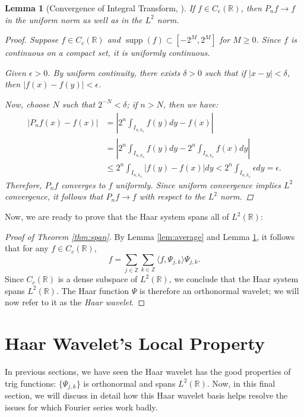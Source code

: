 \documentclass[11pt]{amsart}
\theoremstyle{theorem} %
\newtheorem{lem}[thm]{Lemma} %
\theoremstyle{definition}
\theoremstyle{example}
\theoremstyle{remark}
\numberwithin{equation}{section}
\newcommand{\R}{\mathbb{R}}
\newcommand{\Z}{\mathbb{Z}}
\DeclareMathOperator*{\supp}{supp}
\begin{document}
\begin{lem}[Convergence of Integral Transform, {\cite[517]{davidson}}] \label{lem:convergence}
	If $ f \in C_c(\R) $, then $ P_nf \to f $ in the uniform norm as well as in the $ L^2 $ norm.
	
	\begin{proof}
		Suppose $ f \in C_c(\R) $ and $ \supp(f) \subset [-2^M, 2^M] $ for $ M \geq 0 $. Since $ f $ is continuous on a compact set, it is uniformly continuous.
		
		Given $ \epsilon > 0 $. By uniform continuity, there exists $ \delta > 0 $ such that if $ |x-y| < \delta $, then $ |f(x) - f(y)| < \epsilon $.
		
		Now, choose $ N $ such that $ 2^{-N} < \delta $; if $ n > N $, then we have:
		\begin{align*}
		|P_nf(x) - f(x)| &= \left| 2^n \int_{I_{n,k_x}} f(y)dy - f(x) \right| \\
		&=  \left| 2^n \int_{I_{n,k_x}} f(y)dy - 2^n \int_{I_{n,k_x}} f(x) dy \right| \\
		&\leq 2^n \int_{I_{n,k_x}} |f(y) - f(x)| dy 
		< 2^n \int_{I_{n,k_x}} \epsilon dy = \epsilon.
		\end{align*}
		Therefore, $ P_nf $ converges to $ f $ uniformly. Since uniform convergence implies $ L^2 $ convergence, it follows that $ P_nf \to f $ with respect to the $ L^2 $ norm.
	\end{proof}
\end{lem}

Now, we are ready to prove that the Haar system spans all of $ L^2(\R) $:

\begin{proof}[Proof of Theorem \ref{thm:span}]
	By Lemma \ref{lem:average} and Lemma \ref{lem:convergence}, it follows that for any $ f \in C_c(\R) $, 
	\[
	f = \sum_{j \in \Z} \sum_{k \in \Z} \langle f, \varPsi_{j,k} \rangle \varPsi_{j,k}.
	\]
	Since $ C_c(\R) $ is a dense subspace of $ L^2(\R) $, we conclude that the Haar system spans $ L^2(\R) $. The Haar function $ \varPsi $ is therefore an orthonormal wavelet; we will now refer to it as the \emph{Haar wavelet}.
\end{proof}


\section{Haar Wavelet's Local Property} \label{section:application}
In previous sections, we have seen the Haar wavelet has the good properties of trig functions: $ \{ \varPsi_{j,k} \} $ is orthonormal and spans $ L^2(\R) $. Now, in this final section, we will discuss in detail how this Haar wavelet basis helps resolve the issues for which Fourier series work badly.
\end{document}

